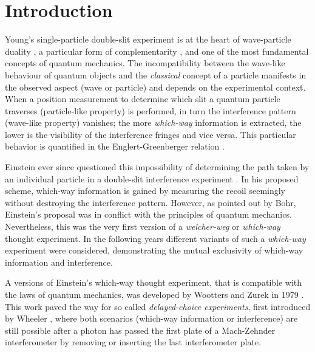 \documentclass[english,keywords,aps,twocolumn]{revtex4-1}
\begin{document}
\maketitle

\section{Introduction}

Young's single-particle double-slit experiment is at the heart of wave-particle duality  \cite{deBroglie,Heisenberg27}, a particular form of complementarity \cite{Bohr28}, and one of the most fundamental concepts of quantum mechanics. The incompatibility between the wave-like behaviour of quantum objects and the \emph{classical} concept of a particle manifests in the observed aspect (wave or particle) and depends on the experimental context. When a position measurement to determine which slit a quantum particle traverses (particle-like property) is performed, in turn the interference pattern (wave-like property) vanishes; the more \emph{which-way} information is extracted, the lower is the visibility of the interference fringes and vice versa. This particular behavior is quantified in the Englert-Greenberger relation \cite{Englert96}.


Einstein ever since questioned this impossibility of determining the path taken by an individual particle in a double-slit interference experiment \cite{EinsteinBook27}. In his proposed scheme, which-way information is gained by measuring the recoil seemingly without destroying the interference pattern. However, as pointed out by Bohr, Einstein's proposal was in conflict with the principles of quantum mechanics. Nevertheless, this was the very first version of a \emph{welcher-weg} or \emph{which-way} thought experiment. In the following years different variants of such a \emph{which-way} experiment were considered, demonstrating the mutual exclusivity of which-way information and interference. 

A versions of Einstein's which-way thought experiment, that is compatible with the laws of quantum mechanics, was developed by Wootters and Zurek in 1979 \cite{Wootters79}.
This work paved the way for so called \emph{delayed-choice experiments}, first introduced by Wheeler \cite{WheelerBook}, where both scenarios (which-way information or interference) are still possible after a photon has passed the first plate of a Mach-Zehnder interferometer by removing or inserting the last interferometer plate.
\end{document}
